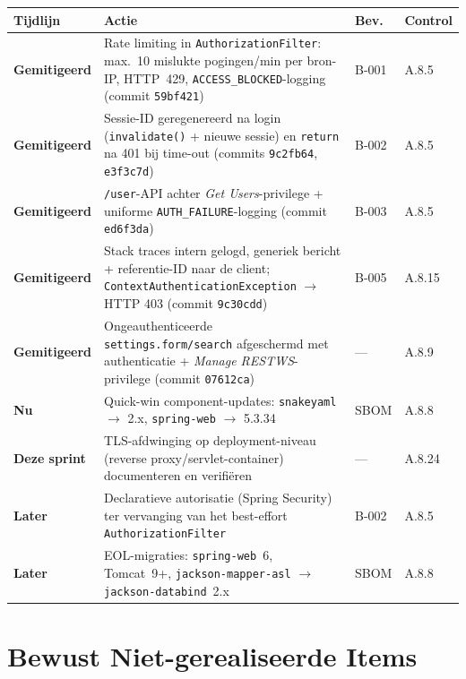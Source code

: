 \documentclass[12pt, a4paper]{report}
\newcommand{\rood}[1]{\textcolor{avansRed}{\textbf{#1}}}
\newcommand{\amber}[1]{\textcolor{ragAmber}{\textbf{#1}}}
\newcommand{\geel}[1]{\textcolor{ragYellow}{\textbf{#1}}}
\newcommand{\groen}[1]{\textcolor{ragGreen}{\textbf{#1}}}
\begin{document}
\vspace{0.4em}
{\small
\begin{tabularx}{\textwidth}{@{}lXll@{}}
\toprule
\textbf{Tijdlijn} & \textbf{Actie} & \textbf{Bev.} & \textbf{Control} \\
\midrule
\groen{Gemitigeerd} &
    Rate limiting in \texttt{AuthorizationFilter}: max.~10 mislukte
    pogingen/min per bron-IP, HTTP~429, \texttt{ACCESS\_BLOCKED}-logging
    (commit \texttt{59bf421}) &
    B-001 & A.8.5 \\
\groen{Gemitigeerd} &
    Sessie-ID geregenereerd na login (\texttt{invalidate()} + nieuwe sessie)
    en \texttt{return} na 401 bij time-out (commits \texttt{9c2fb64},
    \texttt{e3f3c7d}) &
    B-002 & A.8.5 \\
\groen{Gemitigeerd} &
    \texttt{/user}-API achter \emph{Get Users}-privilege + uniforme
    \texttt{AUTH\_FAILURE}-logging (commit \texttt{ed6f3da}) &
    B-003 & A.8.5 \\
\groen{Gemitigeerd} &
    Stack traces intern gelogd, generiek bericht + referentie-ID naar de
    client; \texttt{ContextAuthenticationException} $\to$ HTTP 403
    (commit \texttt{9c30cdd}) &
    B-005 & A.8.15 \\
\groen{Gemitigeerd} &
    Ongeauthenticeerde \texttt{settings.form/search} afgeschermd met
    authenticatie + \emph{Manage RESTWS}-privilege (commit \texttt{07612ca}) &
    --- & A.8.9 \\
\rood{Nu} &
    Quick-win component-updates: \texttt{snakeyaml} $\to$ 2.x,
    \texttt{spring-web} $\to$ 5.3.34 &
    SBOM & A.8.8 \\
\amber{Deze sprint} &
    TLS-afdwinging op deployment-niveau (reverse proxy/servlet-container)
    documenteren en verifiëren &
    --- & A.8.24 \\
\geel{Later} &
    Declaratieve autorisatie (Spring Security) ter vervanging van
    het best-effort \texttt{AuthorizationFilter} &
    B-002 & A.8.5 \\
\geel{Later} &
    EOL-migraties: \texttt{spring-web}~6, Tomcat~9+,
    \texttt{jackson-mapper-asl} $\to$ \texttt{jackson-databind}~2.x &
    SBOM & A.8.8 \\
\bottomrule
\end{tabularx}
}

\section{Bewust Niet-gerealiseerde Items}
\label{sec:niet-gerealiseerd}
\end{document}
